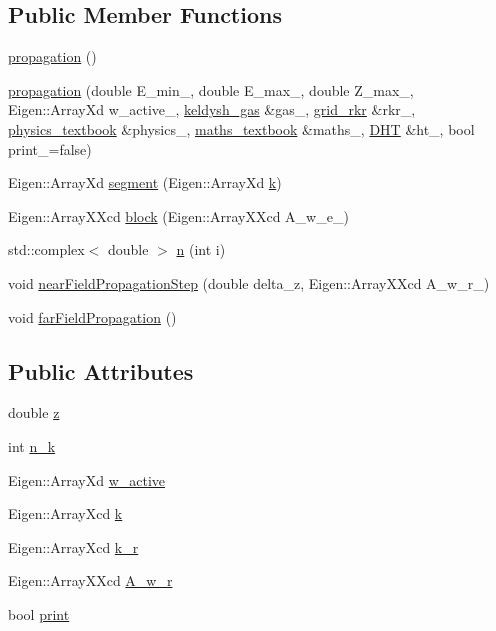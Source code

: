 \subsection*{Public Member Functions}
\begin{DoxyCompactItemize}
\item 
\mbox{\hyperlink{classpropagation_a9d7b9f42ce1c0bc741d3016a07ba13f7}{propagation}} ()
\item 
\mbox{\hyperlink{classpropagation_a83d9af4c672b33155f87756647cd9ada}{propagation}} (double E\+\_\+min\+\_\+, double E\+\_\+max\+\_\+, double Z\+\_\+max\+\_\+, Eigen\+::\+Array\+Xd w\+\_\+active\+\_\+, \mbox{\hyperlink{classkeldysh__gas}{keldysh\+\_\+gas}} \&gas\+\_\+, \mbox{\hyperlink{classgrid__rkr}{grid\+\_\+rkr}} \&rkr\+\_\+, \mbox{\hyperlink{classphysics__textbook}{physics\+\_\+textbook}} \&physics\+\_\+, \mbox{\hyperlink{classmaths__textbook}{maths\+\_\+textbook}} \&maths\+\_\+, \mbox{\hyperlink{class_d_h_t}{D\+HT}} \&ht\+\_\+, bool print\+\_\+=false)
\item 
Eigen\+::\+Array\+Xd \mbox{\hyperlink{classpropagation_a39126bbbd4977c140c0077b849e78bc1}{segment}} (Eigen\+::\+Array\+Xd \mbox{\hyperlink{classpropagation_a49a30e941421cd5e3f0b62bd1335a767}{k}})
\item 
Eigen\+::\+Array\+X\+Xcd \mbox{\hyperlink{classpropagation_af12b15d9b91f98516c0ff25efc1233d1}{block}} (Eigen\+::\+Array\+X\+Xcd A\+\_\+w\+\_\+e\+\_\+)
\item 
std\+::complex$<$ double $>$ \mbox{\hyperlink{classpropagation_a7c696d9e54e5f0a7735047e28aee4866}{n}} (int i)
\item 
void \mbox{\hyperlink{classpropagation_aedba6e1b78d23ae9f5f3f8b8cfd28c19}{near\+Field\+Propagation\+Step}} (double delta\+\_\+z, Eigen\+::\+Array\+X\+Xcd A\+\_\+w\+\_\+r\+\_\+)
\item 
void \mbox{\hyperlink{classpropagation_a9c2e1cb4e314c173b26de08ffcfe071d}{far\+Field\+Propagation}} ()
\end{DoxyCompactItemize}
\subsection*{Public Attributes}
\begin{DoxyCompactItemize}
\item 
double \mbox{\hyperlink{classpropagation_aeacfc091fafd1fdb1af4536f6f587e55}{z}}
\item 
int \mbox{\hyperlink{classpropagation_a93033ee98c04a6fe007eae5c856e76b3}{n\+\_\+k}}
\item 
Eigen\+::\+Array\+Xd \mbox{\hyperlink{classpropagation_a4c24f42d4148eded469c6479d6bf1661}{w\+\_\+active}}
\item 
Eigen\+::\+Array\+Xcd \mbox{\hyperlink{classpropagation_a49a30e941421cd5e3f0b62bd1335a767}{k}}
\item 
Eigen\+::\+Array\+Xcd \mbox{\hyperlink{classpropagation_a9e437271e452fa1732f50e006347b501}{k\+\_\+r}}
\item 
Eigen\+::\+Array\+X\+Xcd \mbox{\hyperlink{classpropagation_ad3a84addde67e43bbb606408193f78ee}{A\+\_\+w\+\_\+r}}
\item 
bool \mbox{\hyperlink{classpropagation_a817c9adeb6635ae4c4f548976f5fb84e}{print}}
\end{DoxyCompactItemize}
